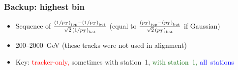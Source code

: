 \documentclass[compress]{beamer}
\begin{document}
\begin{frame}
\frametitle{Backup: highest bin}
\begin{itemize}
\item Sequence of $\frac{\left(1/p_T\right)_{\mbox{\tiny top}} - \left(1/p_T\right)_{\mbox{\tiny bot}}}{\sqrt{2} \, \left(1/p_T\right)_{\mbox{\tiny bot}}}$ (equal to $\frac{\left(p_T\right)_{\mbox{\tiny top}} - \left(p_T\right)_{\mbox{\tiny bot}}}{\sqrt{2} \, \left(p_T\right)_{\mbox{\tiny bot}}}$ if Gaussian)
\item 200--2000~GeV (these tracks were not used in alignment)
\item Key: \textcolor{red}{tracker-only,} sometimes with station~1, \textcolor{darkgreen}{with station~1,} \mbox{\textcolor{blue}{all stations}\hspace{-1 cm}}
\end{itemize}

\mbox{ } \hfill {} \hfill \mbox{ }


\end{frame}
\end{document}
